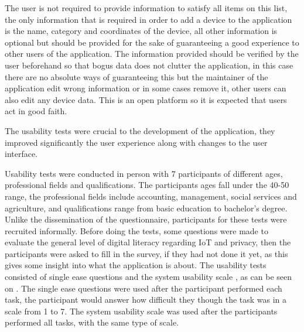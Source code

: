 The user is not required to provide information to satisfy all items on this list, the
only information that is required in order to add a device to the application is
the name, category and coordinates of the device, all other
information is optional but should be provided for the sake of guaranteeing a good
experience to other users of the application. The information provided
should be verified by the user beforehand so that bogus data does not clutter
the application, in this case there are no absolute ways of guaranteeing this
but the maintainer of the application edit wrong information or in some
cases remove it, other users can also edit any device data. This is an
open platform so it is expected that users act in good faith.

The usability tests were crucial to the development of the application,
they improved significantly the user experience along with changes to the
user interface.

Usability tests were conducted in person with 7 participants of different
ages, professional fields and qualifications. The participants ages fall
under the 40-50 range, the professional fields include accounting,
management, social services and agriculture, and qualifications range from
basic education to bachelor's degree. Unlike the dissemination of the questionnaire,
participants for these tests were recruited informally. Before doing the tests,
some questions were made to evaluate the general level of digital literacy
regarding IoT and privacy, then the participants were asked to fill in the
survey, if they had not done it yet, as this gives some insight into what the
application is about. The usability tests consisted of single ease
questions \cite{tedesco2006comparison}
and the system usability scale \cite{brooke1996sus}, as can be seen on .
The single ease questions were used after the participant performed each task, the
participant would answer how difficult they though the task was in a
scale from 1 to 7. The system usability scale was used after the participants
performed all tasks, with the same type of scale.
